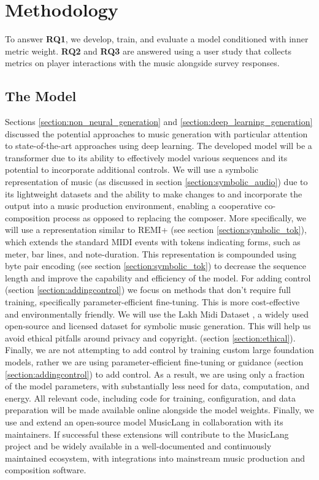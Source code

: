 
\chapter{Methodology}
To answer \textbf{RQ1}, we develop, train, and evaluate a model conditioned with inner metric weight. \textbf{RQ2} and \textbf{RQ3} are answered using a user study that collects metrics on player interactions with the music alongside survey responses. 

\section{The Model}
Sections \ref{section:non_neural_generation} and \ref{section:deep_learning_generation} discussed the potential approaches to music generation with particular attention to state-of-the-art approaches using deep learning. The developed model will be a transformer due to its ability to effectively model various sequences and its potential to incorporate additional controls. We will use a symbolic representation of music (as discussed in section \ref{section:symbolic_audio}) due to its lightweight datasets and the ability to make changes to and incorporate the output into a music production environment, enabling a cooperative co-composition process as opposed to replacing the composer. More specifically, we will use a representation similar to REMI+ (see section \ref{section:symbolic_tok}), which extends the standard MIDI events with tokens indicating forms, such as meter, bar lines, and note-duration. This representation is compounded using byte pair encoding (see section \ref{section:symbolic_tok}) to decrease the sequence length and improve the capability and efficiency of the model. For adding control (section \ref{section:addingcontrol}) we focus on methods that don't require full training, specifically parameter-efficient fine-tuning. This is more cost-effective and environmentally friendly. 
We will use the Lakh Midi Dataset \cite{Raffel_2016}, a widely used open-source and licensed dataset for symbolic music generation. This will help us avoid ethical pitfalls around privacy and copyright. (section \ref{section:ethical}). Finally, we are not attempting to add control by training custom large foundation models, rather we are using parameter-efficient fine-tuning or guidance (section \ref{section:addingcontrol}) to add control. As a result, we are using only a fraction of the model parameters, with substantially less need for data, computation, and energy. All relevant code, including code for training, configuration, and data preparation will be made available online alongside the model weights. Finally, we use and extend an open-source model MusicLang in collaboration with its maintainers. If successful these extensions will contribute to the MusicLang project and be widely available in a well-documented and continuously maintained ecosystem, with integrations into mainstream music production and composition software. 

